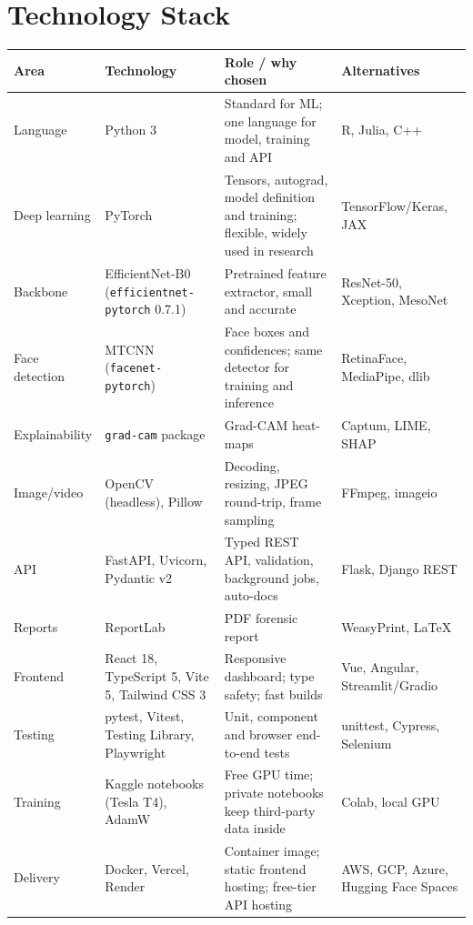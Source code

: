 \documentclass[11pt,a4paper]{report}
\begin{document}
\chapter{Technology Stack}
\begin{center}
\small
\begin{tabular}{|L{2.3cm}|L{3.3cm}|L{4.0cm}|L{4.0cm}|}
\hline
\textbf{Area} & \textbf{Technology} & \textbf{Role / why chosen} & \textbf{Alternatives}\\\hline
Language & Python 3 & Standard for ML; one language for model, training and API & R, Julia, C++\\\hline
Deep learning & PyTorch & Tensors, autograd, model definition and training; flexible, widely used in research & TensorFlow/Keras, JAX\\\hline
Backbone & EfficientNet-B0 (\texttt{efficientnet-}\allowbreak\texttt{pytorch} 0.7.1) & Pretrained feature extractor, small and accurate & ResNet-50, Xception, MesoNet\\\hline
Face detection & MTCNN (\texttt{facenet-pytorch}) & Face boxes and confidences; same detector for training and inference & RetinaFace, MediaPipe, dlib\\\hline
Explainability & \texttt{grad-cam} package & Grad-CAM heat-maps & Captum, LIME, SHAP\\\hline
Image/video & OpenCV (headless), Pillow & Decoding, resizing, JPEG round-trip, frame sampling & FFmpeg, imageio\\\hline
API & FastAPI, Uvicorn, Pydantic v2 & Typed REST API, validation, background jobs, auto-docs & Flask, Django REST\\\hline
Reports & ReportLab & PDF forensic report & WeasyPrint, LaTeX\\\hline
Frontend & React 18, TypeScript 5, Vite 5, Tailwind CSS 3 & Responsive dashboard; type safety; fast builds & Vue, Angular, Streamlit/Gradio\\\hline
Testing & pytest, Vitest, Testing Library, Playwright & Unit, component and browser end-to-end tests & unittest, Cypress, Selenium\\\hline
Training & Kaggle notebooks (Tesla T4), AdamW & Free GPU time; private notebooks keep third-party data inside & Colab, local GPU\\\hline
Delivery & Docker, Vercel, Render & Container image; static frontend hosting; free-tier API hosting & AWS, GCP, Azure, Hugging Face Spaces\\\hline
\end{tabular}
\end{center}
\end{document}
